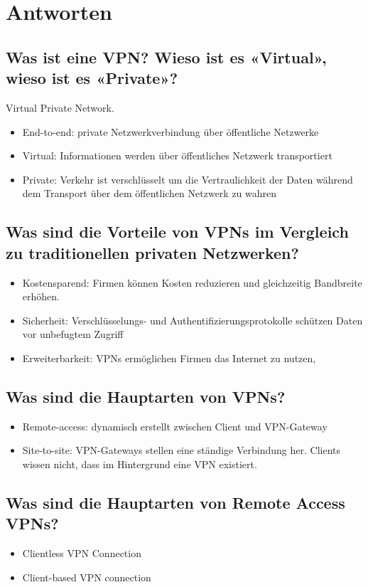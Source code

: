\section{Antworten}
\subsection*{Was ist eine VPN? Wieso ist es «Virtual», wieso ist es «Private»?}
Virtual Private Network.
\begin{itemize}
    \item End-to-end: private Netzwerkverbindung über öffentliche Netzwerke
    \item Virtual: Informationen werden über öffentliches Netzwerk transportiert
    \item Private: Verkehr ist verschlüsselt um die Vertraulichkeit der Daten während dem Transport über dem öffentlichen Netzwerk zu wahren
\end{itemize}

\subsection*{Was sind die Vorteile von VPNs im Vergleich zu traditionellen privaten Netzwerken?}
\begin{itemize}
    \item Kostensparend: Firmen können Kosten reduzieren und gleichzeitig Bandbreite erhöhen.
    \item Sicherheit: Verschlüsselungs- und Authentifizierungsprotokolle schützen Daten vor unbefugtem Zugriff
    \item Erweiterbarkeit: VPNs ermöglichen Firmen das Internet zu nutzen,
\end{itemize}

\subsection*{Was sind die Hauptarten von VPNs?}
\begin{itemize}
    \item Remote-access: dynamisch erstellt zwischen Client und VPN-Gateway
    \item Site-to-site: VPN-Gateways stellen eine ständige Verbindung her. Clients wissen nicht, dass im Hintergrund eine VPN existiert.
\end{itemize}

\subsection*{Was sind die Hauptarten von Remote Access VPNs?}
\begin{itemize}
    \item Clientless VPN Connection
    \item Client-based VPN connection
\end{itemize}

